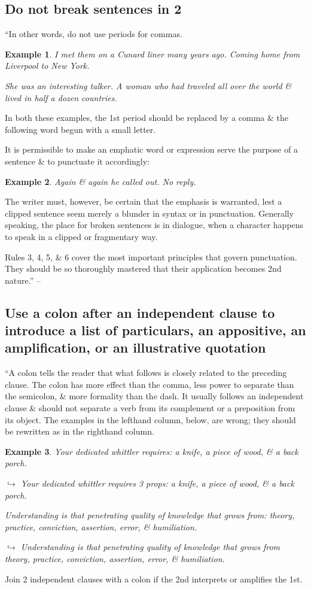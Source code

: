 \documentclass[oneside]{book}
\numberwithin{equation}{section}
\newtheorem{example}{Example}[chapter]
\begin{document}
\subsection{Do not break sentences in 2}
``In other words, do not use periods for commas.

\begin{example}
	I met them on a Cunard liner many years ago. Coming home from Liverpool to New York.
	
	She was an interesting talker. A woman who had traveled all over the world \& lived in half a dozen countries.
\end{example}
In both these examples, the 1st period should be replaced by a comma \& the following word begun with a small letter.

It is permissible to make an emphatic word or expression serve the purpose of a sentence \& to punctuate it accordingly:

\begin{example}
	Again \& again he called out. No reply.
\end{example}
The writer must, however, be certain that the emphasis is warranted, lest a clipped sentence seem merely a blunder in syntax or in punctuation. Generally speaking, the place for broken sentences is in dialogue, when a character happens to speak in a clipped or fragmentary way.

Rules 3, 4, 5, \& 6 cover the most important principles that govern punctuation. They should be so thoroughly mastered that their application becomes 2nd nature.'' -- \cite[Chap. 1, Sect. 6, p. 20]{Strunk_White2019}

\subsection{Use a colon after an independent clause to introduce a list of particulars, an appositive, an amplification, or an illustrative quotation}
``A colon tells the reader that what follows is closely related to the preceding clause. The colon has more effect than the comma, less power to separate than the semicolon, \& more formality than the dash. It usually follows an independent clause \& should not separate a verb from its complement or a preposition from its object. The examples in the lefthand column, below, are wrong; they should be rewritten as in the righthand column.

\begin{example}
	Your dedicated whittler requires: a knife, a piece of wood, \& a back porch.
	
	$\hookrightarrow$ Your dedicated whittler requires 3 props: a knife, a piece of wood, \& a back porch.
	
	Understanding is that penetrating quality of knowledge that grows from: theory, practice, conviction, assertion, error, \& humiliation.
	
	$\hookrightarrow$ Understanding is that penetrating quality of knowledge that grows from theory, practice, conviction, assertion, error, \& humiliation.
\end{example}
Join 2 independent clauses with a colon if the 2nd interprets or amplifies the 1st.
\end{document}

